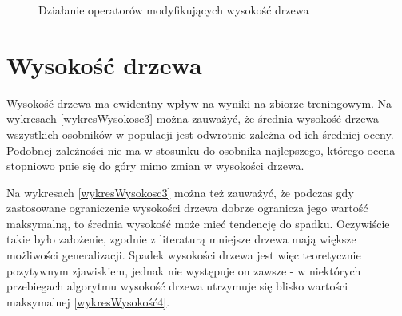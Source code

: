 \documentclass[twoside]{iisthesis}
\begin{document}
\begin{figure}[h]
\center
\caption{Działanie operatorów modyfikujących wysokość drzewa}
\label{wykresyWysokosc1}
\end{figure}

\section {Wysokość drzewa}

Wysokość drzewa ma ewidentny wpływ na wyniki na zbiorze treningowym. Na wykresach \ref{wykresWysokosc3} można zauważyć, że średnia wysokość drzewa wszystkich osobników w populacji jest odwrotnie zależna od ich średniej oceny. Podobnej zależności nie ma w stosunku do osobnika najlepszego, którego ocena stopniowo pnie się do góry mimo zmian w wysokości drzewa.

Na wykresach \ref{wykresWysokosc3} można też zauważyć, że podczas gdy zastosowane ograniczenie wysokości drzewa dobrze ogranicza jego wartość maksymalną, to średnia wysokość może mieć tendencję do spadku. Oczywiście takie było założenie, zgodnie z literaturą mniejsze drzewa mają większe możliwości generalizacji. Spadek wysokości drzewa jest więc teoretycznie pozytywnym zjawiskiem, jednak nie występuje on zawsze - w niektórych przebiegach algorytmu wysokość drzewa utrzymuje się blisko wartości maksymalnej \ref{wykresWysokość4}.
\end{document}
